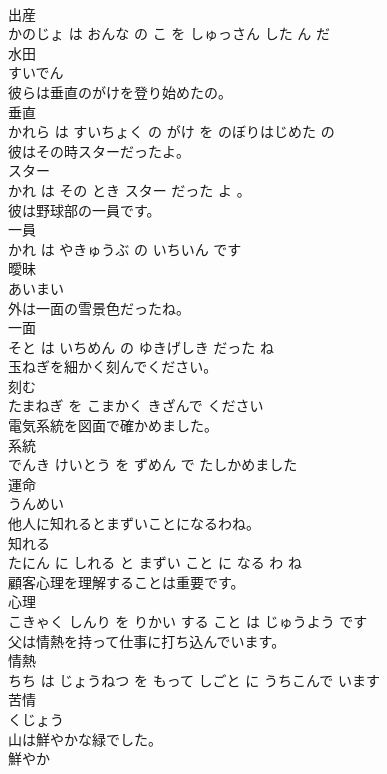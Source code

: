 \documentclass[8pt]{extreport}
\begin{document}
\begin{CJK}{UTF8}{min}
\\	出産 
\\	かのじょ は おんな の こ を しゅっさん した ん だ			
\\	水田	
\\	すいでん			
\\	彼らは垂直のがけを登り始めたの。	
\\	垂直 
\\	かれら は すいちょく の がけ を のぼりはじめた の			
\\	彼はその時スターだったよ。	
\\	スター 
\\	かれ は その とき スター だった よ 。			
\\	彼は野球部の一員です。	
\\	一員 
\\	かれ は やきゅうぶ の いちいん です			
\\	曖昧	
\\	あいまい			
\\	外は一面の雪景色だったね。	
\\	一面 
\\	そと は いちめん の ゆきげしき だった ね			
\\	玉ねぎを細かく刻んでください。	
\\	刻む 
\\	たまねぎ を こまかく きざんで ください			
\\	電気系統を図面で確かめました。	
\\	系統 
\\	でんき けいとう を ずめん で たしかめました			
\\	運命	
\\	うんめい			
\\	他人に知れるとまずいことになるわね。	
\\	知れる 
\\	たにん に しれる と まずい こと に なる わ ね			
\\	顧客心理を理解することは重要です。	
\\	心理 
\\	こきゃく しんり を りかい する こと は じゅうよう です			
\\	父は情熱を持って仕事に打ち込んでいます。	
\\	情熱 
\\	ちち は じょうねつ を もって しごと に うちこんで います			
\\	苦情	
\\	くじょう			
\\	山は鮮やかな緑でした。	
\\	鮮やか 

\end{CJK}
\end{document}
